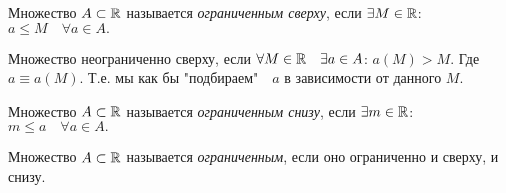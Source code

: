     \begin{definition}
        Множество $A \subset \mathbb{R}$ называется \textit{ограниченным сверху}, если $\exists M \in \mathbb{R}$: $a \leq M \quad \forall a \in A.$
    \end{definition}
    \begin{note}
        Множество неограниченно сверху, если $\forall M \in \mathbb{R} \quad \exists a \in A$: $a(M) > M.$ Где $a \equiv a(M).$ Т.е. мы как бы "подбираем" $\text{ }a$ в зависимости от данного $M.$
    \end{note}
    \begin{definition}
        Множество $A \subset \mathbb{R}$ называется \textit{ограниченным снизу}, если $\exists m \in \mathbb{R}$: $m \leq a  \quad \forall a \in A.$
    \end{definition}
    \begin{definition}
        Множество $A \subset \mathbb{R}$ называется \textit{ограниченным}, если оно ограниченно и сверху, и снизу.
    \end{definition}
